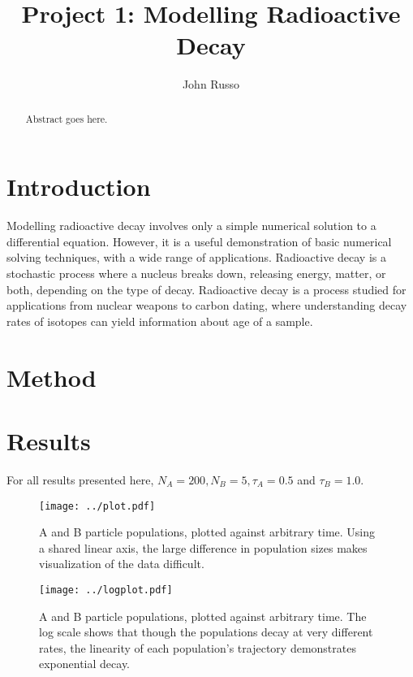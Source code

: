 \documentclass[pra,twocolumn,showpacs,amsmath,amssymb]{revtex4-1}
\begin{document}
\title{Project 1: Modelling Radioactive Decay}


\author{John Russo}

\begin{abstract}
Abstract goes here.
\end{abstract}

\pacs{}


\maketitle

\section{Introduction} \label{sec:intro}

Modelling radioactive decay involves only a simple numerical solution to a
differential equation. However, it is a useful demonstration of basic numerical
solving techniques, with a wide range of applications.
Radioactive decay is a stochastic process where a nucleus breaks down, releasing
energy, matter, or both, depending on the type of decay.
Radioactive decay is a process studied for applications from nuclear weapons to
carbon dating, where understanding decay rates of isotopes can yield information
about age of a sample.

\section{Method}

\section{Results}

For all results presented here, $N_A = 200, N_B = 5, \tau_A = 0.5$ and $\tau_B = 1.0$.

\begin{figure}
  \vspace{2ex}
  \texttt{[image: ../plot.pdf]}
  \caption{A and B particle populations, plotted against arbitrary time. Using
  a shared linear axis, the large difference in population sizes makes
  visualization of the data difficult.}
  \label{fig:linplot}
\end{figure}

\begin{figure}
  \vspace{2ex}
  \texttt{[image: ../logplot.pdf]}
  \caption{A and B particle populations, plotted against arbitrary time. The log
  scale shows that though the populations decay at very different rates, the
  linearity of each population's trajectory demonstrates exponential decay.}
  \label{fig:logplot}
\end{figure}
\end{document}
